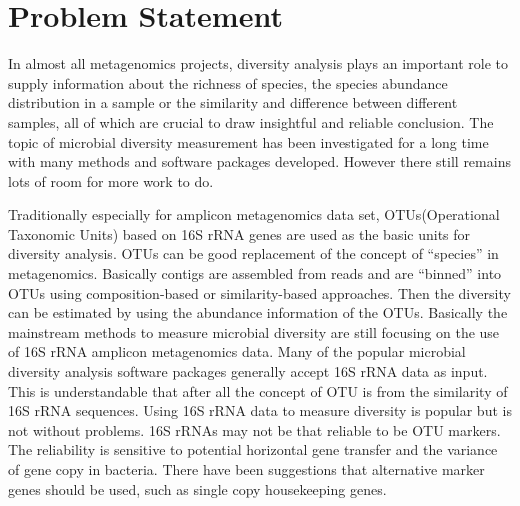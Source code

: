 \section{Problem Statement}


In almost all  metagenomics projects, diversity analysis plays an important
role to supply information about the richness of species, the species abundance
distribution in a sample or the similarity and difference between different 
samples, all of which are crucial to draw insightful and reliable conclusion. 
The topic of microbial diversity measurement
has been investigated for a long time with many methods and software packages
developed. However there still remains lots of room for more work to do.


Traditionally especially for amplicon metagenomics data set, OTUs(Operational 
Taxonomic Units) based on 16S rRNA genes are used as the basic units for 
diversity analysis. OTUs can be good replacement of the concept of ``species'' in 
metagenomics. Basically contigs are assembled from reads and are ``binned'' into
OTUs using composition-based or similarity-based approaches. Then the diversity
can be estimated by using the abundance information of the OTUs.
Basically the mainstream methods to measure microbial diversity are still
focusing on the use of 16S rRNA amplicon metagenomics data. 
Many of the
popular microbial diversity analysis software packages generally accept 
16S rRNA data as
input. This is understandable that after all the concept of OTU is from the
similarity of 16S rRNA sequences. Using 16S rRNA data to measure diversity is
popular but is not without problems. 16S rRNAs may not be that reliable to be
OTU markers. The reliability is sensitive to potential horizontal gene transfer
and the variance of gene copy in bacteria. There have been suggestions that
alternative marker genes should be used, such as single copy housekeeping genes.

